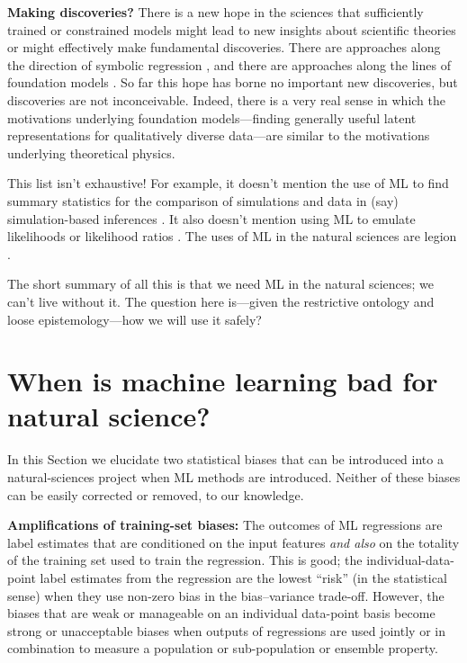 \documentclass{article}
\renewcommand{\paragraph}[1]{\noindent\par\textbf{#1}}
\newcommand{\sectionname}{Section}
\begin{document}
\paragraph{Making discoveries?}
There is a new hope in the sciences that sufficiently trained or constrained models might lead to new insights about scientific theories or might effectively make fundamental discoveries.
There are approaches along the direction of symbolic regression \cite{symbolic1, symbolic2}, and there are approaches along the lines of foundation models \cite{foundation1}.
So far this hope has borne no important new discoveries, but discoveries are not inconceivable.
Indeed, there is a very real sense in which the motivations underlying foundation models---finding generally useful latent representations for qualitatively diverse data---are similar to the motivations underlying theoretical physics.

\medskip
This list isn't exhaustive!
For example, it doesn't mention the use of ML to find summary statistics for the comparison of simulations and data in (say) simulation-based inferences \cite{sbi, simbig}.
It also doesn't mention using ML to emulate likelihoods or likelihood ratios \cite{biwei, likelihood_ratio}.
The uses of ML in the natural sciences are legion \cite{wang2023scientific,zhang2023artificial}.

The short summary of all this is that we need ML in the natural sciences; we can't live without it.
The question here is---given the restrictive ontology and loose epistemology---how we will use it safely?

\section{When is machine learning bad for natural science?}\label{sec:bad}
In this \sectionname{} we elucidate two statistical biases that can be introduced into a natural-sciences project when ML methods are introduced.
Neither of these biases can be easily corrected or removed, to our knowledge.

\paragraph{Amplifications of training-set biases:}
The outcomes of ML regressions are label estimates that are conditioned on the input features \emph{and also} on the totality of the training set used to train the regression.
This is good; the individual-data-point label estimates from the regression are the lowest ``risk'' (in the statistical sense) when they use non-zero bias in the bias--variance trade-off.
However, the biases that are weak or manageable on an individual data-point basis become strong or unacceptable biases when outputs of regressions are used jointly or in combination to measure a population or sub-population or ensemble property.
\end{document}
